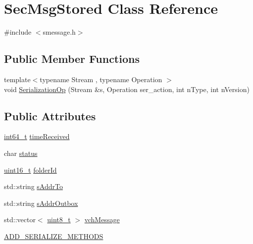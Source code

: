 \hypertarget{class_sec_msg_stored}{}\section{Sec\+Msg\+Stored Class Reference}
\label{class_sec_msg_stored}


{\ttfamily \#include $<$smessage.\+h$>$}

\subsection*{Public Member Functions}
\begin{DoxyCompactItemize}
\item 
{\footnotesize template$<$typename Stream , typename Operation $>$ }\\void \hyperlink{class_sec_msg_stored_a04684c852fb85f4bb0bfa3248a057e7f}{Serialization\+Op} (Stream \&s, Operation ser\+\_\+action, int n\+Type, int n\+Version)
\end{DoxyCompactItemize}
\subsection*{Public Attributes}
\begin{DoxyCompactItemize}
\item 
\hyperlink{stdint_8h_adec1df1b8b51cb32b77e5b86fff46471}{int64\+\_\+t} \hyperlink{class_sec_msg_stored_a9c3a85bc56cd832e5cdf3f04aa37eb3c}{time\+Received}
\item 
char \hyperlink{class_sec_msg_stored_a63b5b4cfb96450a5c170981e108315fe}{status}
\item 
\hyperlink{stdint_8h_a273cf69d639a59973b6019625df33e30}{uint16\+\_\+t} \hyperlink{class_sec_msg_stored_a1ec4984f1718b756aeb18b44aaf4fbad}{folder\+Id}
\item 
std\+::string \hyperlink{class_sec_msg_stored_af1f7fa5c7ae4fb43ad914e87686425a1}{s\+Addr\+To}
\item 
std\+::string \hyperlink{class_sec_msg_stored_a9200ada27d6664d6c4c995fac0ed486d}{s\+Addr\+Outbox}
\item 
std\+::vector$<$ \hyperlink{stdint_8h_aba7bc1797add20fe3efdf37ced1182c5}{uint8\+\_\+t} $>$ \hyperlink{class_sec_msg_stored_a109dca8a348a188efba86d41e21cdfed}{vch\+Message}
\item 
\hyperlink{class_sec_msg_stored_a0d1bc2f6c5a7453f0343d230bd76e8a0}{A\+D\+D\+\_\+\+S\+E\+R\+I\+A\+L\+I\+Z\+E\+\_\+\+M\+E\+T\+H\+O\+D\+S}
\end{DoxyCompactItemize}


